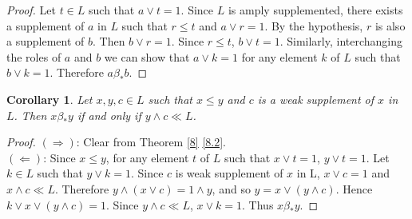 \documentclass[a4paper,12pt]{article}
\newtheorem{corollary}[theorem]{Corollary}
\numberwithin{equation}{section}
\begin{document}
\begin{proof}
  Let $ t \in L $ such that $ a \vee t = 1 $. Since $ L $ is amply supplemented, there exists 
  a supplement of $ a $ in $ L $ such that $ r \leq t $ and $ a \vee r = 1 $. By the hypothesis, 
  $ r $ is also a supplement of $ b $. Then $ b \vee r = 1 $. Since $ r \leq t $, $ b \vee t = 1 $. 
  Similarly, interchanging the roles of $ a $ and $ b $ we can show that $ a \vee k = 1 $ for any 
  element $ k $ of $ L $ such that $ b \vee k = 1 $. Therefore $ a \beta_* b $.
\end{proof}

\begin{corollary}\label{10}
  Let $ x,y,c \in L $ such that $ x \leq y $ and $ c $ is a weak supplement of $ x $ in $ L $. Then 
  $ x \beta_* y $ if and only if $ y \wedge c \ll L $.
\end{corollary}

\begin{proof}
  $ ( \Rightarrow ) $: 
  Clear from Theorem \ref{8} \ref{8.2}. \\
  $ ( \Leftarrow ) $:  
  Since $ x \leq y $, for any element $ t $ of $ L $ such that $ x \vee t = 1 $, $ y \vee t = 1 $. 
  Let $ k \in L $ such that $ y \vee k = 1 $. Since $ c $ is weak supplement of $ x $ in L, 
  $ x \vee c = 1 $ and $ x \wedge c \ll L $. Therefore $ y \wedge ( x \vee c ) = 1 \wedge y $, and so 
  $ y = x \vee ( y \wedge c ) $. Hence $ k \vee x \vee ( y \wedge c ) = 1 $. Since $ y \wedge c \ll L $, 
  $ x \vee k = 1 $. Thus $ x \beta_* y $.
\end{proof}

\end{document}
